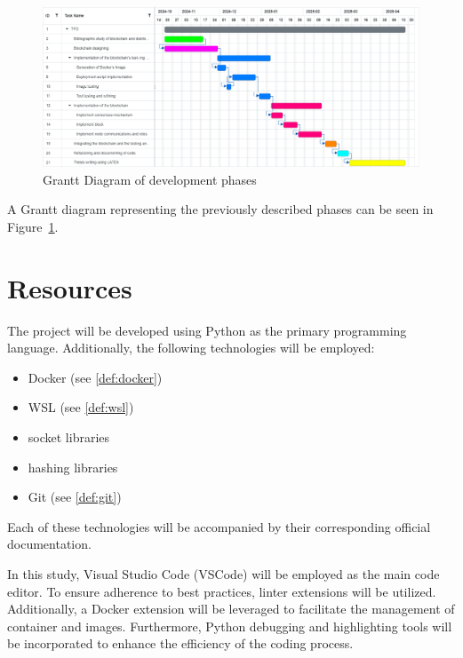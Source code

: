\documentclass[twocolumn]{article}
\begin{document}
\begin{figure}[!h]
    \centering
    \includegraphics[width=2.2\linewidth]{Images/Grantt TFG.png}
    \captionsetup{justification=raggedright}
    \caption{Grantt Diagram of development phases}
    \label{fig:Grantt diagram}
\end{figure}

\newpage
\noindent A Grantt diagram representing the previously described phases can be seen in Figure~\ref{fig:Grantt diagram}.
\section{Resources}

The project will be developed using Python as the primary programming language. Additionally, the following technologies will be employed:
\begin{itemize}
    \item Docker (see \cref{def:docker})
    \item WSL (see \cref{def:wsl})
    \item socket libraries
    \item hashing libraries
    \item Git (see \cref{def:git})
\end{itemize}
Each of these technologies will be accompanied by their corresponding official documentation.

\noindent In this study, Visual Studio Code (VSCode) will be employed as the main code editor. To ensure adherence to best practices, linter extensions will be utilized. Additionally, a Docker extension will be leveraged to facilitate the management of container and images. Furthermore, Python debugging and highlighting tools will be incorporated to enhance the efficiency of the coding process.
\end{document}
